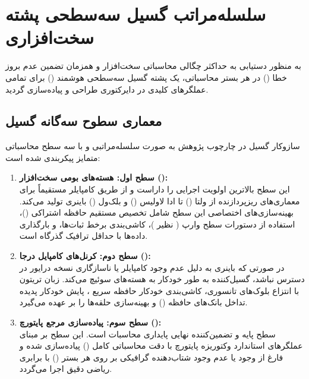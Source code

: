 \documentclass[12pt,a4paper]{report}
\theoremstyle{definition}
\begin{document}
\section{سلسله‌مراتب گسیل سه‌سطحی پشته سخت‌افزاری }
\label{sec:three_level_fallback}
به منظور دستیابی به حداکثر چگالی محاسباتی سخت‌افزار و همزمان تضمین عدم بروز خطا () در هر بستر محاسباتی، یک پشته گسیل سه‌سطحی هوشمند () برای تمامی عملگرهای کلیدی در دایرکتوری  طراحی و پیاده‌سازی گردید.

\subsection{معماری سطوح سه‌گانه گسیل}
سازوکار گسیل در چارچوب پژوهش به صورت سلسله‌مراتبی و با سه سطح محاسباتی متمایز پیکربندی شده است:
\begin{enumerate}
    \item \textbf{سطح اول: هسته‌های بومی سخت‌افزار ():} \\
    این سطح بالاترین اولویت اجرایی را داراست و از طریق کامپایلر  مستقیماً برای معماری‌های ریزپردازنده از ولتا () تا ادا لاولیس () و بلک‌ول () باینری تولید می‌کند. بهینه‌سازی‌های اختصاصی این سطح شامل تخصیص مستقیم حافظه اشتراکی ()، استفاده از دستورات سطح وارپ ( نظیر )، کاشی‌بندی برخط ثبات‌ها، و بارگذاری داده‌ها با حداقل ترافیک گذرگاه  است.

    \item \textbf{سطح دوم: کرنل‌های کامپایل درجا ():} \\
    در صورتی که باینری  به دلیل عدم وجود کامپایلر یا ناسازگاری نسخه درایور در دسترس نباشد، گسیل‌کننده به طور خودکار به هسته‌های  سوئیچ می‌کند. زبان تریتون با انتزاع بلوک‌های تانسوری، کاشی‌بندی خودکار حافظه سریع ، پایش خودکار پدیده تداخل بانک‌های حافظه () و بهینه‌سازی حلقه‌ها را بر عهده می‌گیرد.

    \item \textbf{سطح سوم: پیاده‌سازی مرجع پایتورچ ():} \\
    سطح پایه و تضمین‌کننده نهایی پایداری محاسبات است. این سطح بر مبنای عملگرهای استاندارد وکتوریزه پایتورچ با دقت محاسباتی کامل () پیاده‌سازی شده و فارغ از وجود یا عدم وجود شتاب‌دهنده گرافیکی بر روی هر بستر () با برابری ریاضی دقیق اجرا می‌گردد.
\end{enumerate}
\end{document}

